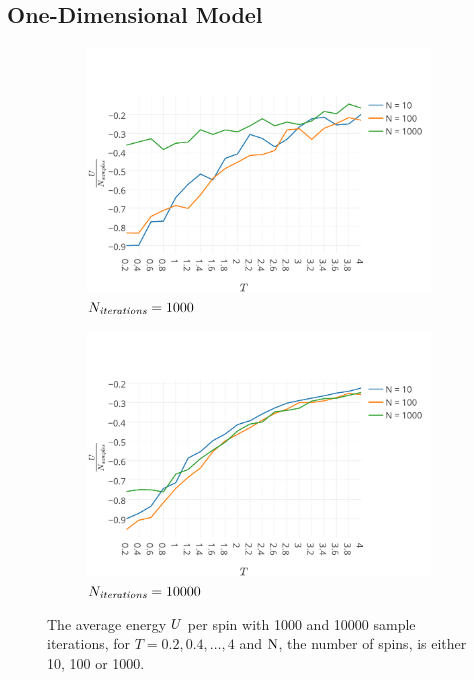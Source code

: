 
\subsection{One-Dimensional Model}


	\begin{figure}
		\centering
		\begin{subfigure}{0.49\textwidth}
			\centering
			\includegraphics[width=\textwidth, keepaspectratio=true]{img/1D/1DaverageEnergyN1000.pdf}
			\caption{$N_\textit{iterations} = 1000$}
			\label{fig:results:1D:U:1000}
		\end{subfigure}
		\begin{subfigure}{0.49\textwidth}
			\centering
			\includegraphics[width=\textwidth, keepaspectratio=true]{img/1D/1DaverageEnergyN10000.pdf}
			\caption{$N_\textit{iterations} = 10000$}
			\label{fig:results:1D:U:10000}
		\end{subfigure}	
		\caption{The average energy $U$ per spin with  1000 and  10000 sample iterations, for $T = 0.2, 0.4, \dotsc, 4$ and $\mathrm{N}$, the number of spins, is either 10, 100 or 1000.}
		\label{fig:results:1D:U}
	\end{figure}

